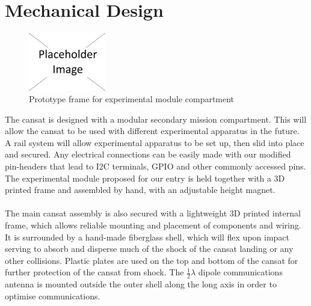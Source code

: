\documentclass{report}
\begin{document}
	\section{Mechanical Design}

		\begin{figure}
			\vspace{-47pt}
	 		\begin{center}
			\includegraphics[width=0.30\textwidth]{placeholder}
			\end{center}
			\vspace{-15pt}
			\caption[X]{Prototype frame for experimental module compartment}
		\end{figure}

		The cansat is designed with a modular secondary mission compartment. 
		This will allow the cansat to be used with different experimental apparatus 
		in the future. A rail system will allow experimental apparatus to be set up,
		then slid into place and secured. Any electrical connections can be easily
		made with our modified pin-headers that lead to I2C terminals, GPIO and
		other commonly accessed pins. The experimental module proposed for 
		our entry is held together with a 3D printed frame and assembled by 
		hand, with an adjustable height magnet.
		\\\\
		The main cansat assembly is also secured with a lightweight 3D printed
		internal frame, which allows reliable mounting and placement of components
		and wiring. It is surrounded by a hand-made fiberglass shell, which will flex
		upon impact serving to absorb and disperse much of the shock of the
		cansat landing or any other collisions. Plastic plates are used on the top and
		bottom of the cansat for further protection of the cansat from shock. The 
		$\frac{1}{2}\lambda$ dipole communications antenna is mounted outside
		the outer shell along the long axis in order to optimise communications.
\end{document}
